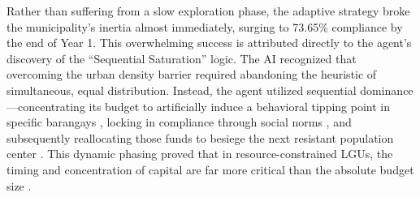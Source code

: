 Rather than suffering from a slow exploration phase, the adaptive strategy broke the municipality's inertia almost immediately, surging to 73.65\% compliance by the end of Year 1. This overwhelming success is attributed directly to the agent's discovery of the ``Sequential Saturation'' logic. The AI recognized that overcoming the urban density barrier required abandoning the heuristic of simultaneous, equal distribution. Instead, the agent utilized sequential dominance---concentrating its budget to artificially induce a behavioral tipping point in specific barangays \citep{Centola2018, Nyborg2024}, locking in compliance through social norms \citep{Andre2021}, and subsequently reallocating those funds to besiege the next resistant population center \citep{Nishimura2022}. This dynamic phasing proved that in resource-constrained LGUs, the timing and concentration of capital are far more critical than the absolute budget size \citep{Jimenez2025}.